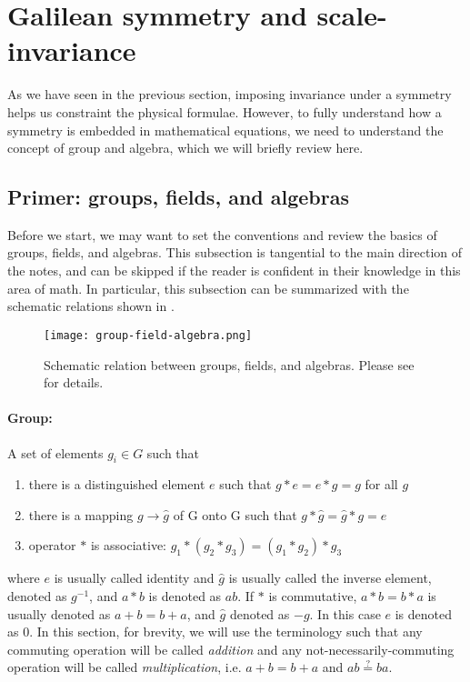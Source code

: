 \section{Galilean  symmetry and scale-invariance}
As we have seen in the previous section, imposing invariance under a symmetry helps us constraint the physical formulae. However, to fully understand how a symmetry is embedded in mathematical equations, we need to understand the concept of group and algebra, which we will briefly review here.

\subsection{Primer: groups, fields, and algebras}
\label{sec: review of groups, fields, and algebras}
Before we start, we may want to set the conventions and review the basics of groups, fields, and algebras. This subsection is tangential to the main direction of the notes, and can be skipped if the reader is confident in their knowledge in this area of math. In particular, this subsection can be summarized with the schematic relations shown in \figref{\ref{fig: group-field-algebra}}.

\begin{figure}
	\centering 
	\texttt{[image: group-field-algebra.png]}
	\caption[Schematic relation between groups, fields, and algebras]{\label{fig: group-field-algebra} Schematic relation between groups, fields, and algebras. Please see \secref{\ref{sec: review of groups, fields, and algebras}} for details.}
\end{figure}

\paragraph{Group:} A set of elements $g_i \in G$ such that
\begin{enumerate}
	\item there is a distinguished element $e$ such that $g*e=e*g=g$ for all $g$
	\item there is a mapping $g\to \hat g$ of G onto G such that $g*\hat g=\hat g*g=e$
	\item operator $*$ is associative: $g_1*(g_2*g_3)=(g_1*g_2)*g_3$
\end{enumerate}
where $e$ is usually called identity and $\hat g$ is usually called the inverse element, denoted as $g^{-1}$, and $a*b$ is denoted as $a b$. If $*$ is commutative, $a*b=b*a$ is usually denoted as $a+b=b+a$, and $\hat g$ denoted as $-g$. In this case $e$ is denoted as $0$. In this section, for brevity, we will use the terminology such that any commuting operation will be called \emph{addition} and any  not-necessarily-commuting operation will be called \emph{multiplication}, i.e. $a+b=b+a$ and $ab\stackrel{?}{=}ba$.

